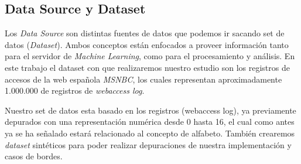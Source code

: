 \subsection{Data Source y Dataset }

	Los \emph{Data Source} son distintas fuentes de datos que podemos ir sacando set de datos (\emph{Dataset}). Ambos conceptos están enfocados a proveer información tanto para el servidor de \emph{Machine Learning}, como para el procesamiento y análisis.
	En este trabajo el dataset con que realizaremos nuestro estudio son los registros de accesos de la web española \emph{MSNBC}\cite{Claude2014}, los cuales representan aproximadamente 1.000.000 de registros de \emph{webaccess log}.

	Nuestro set de  datos esta basado en los registros (webaccess log), ya previamente depurados con una representación numérica desde 0 hasta 16, el cual como antes ya se ha señalado estará relacionado al concepto de alfabeto. También crearemos \emph{dataset} sintéticos para poder realizar depuraciones de nuestra implementación y casos de bordes.
	
	 



 














